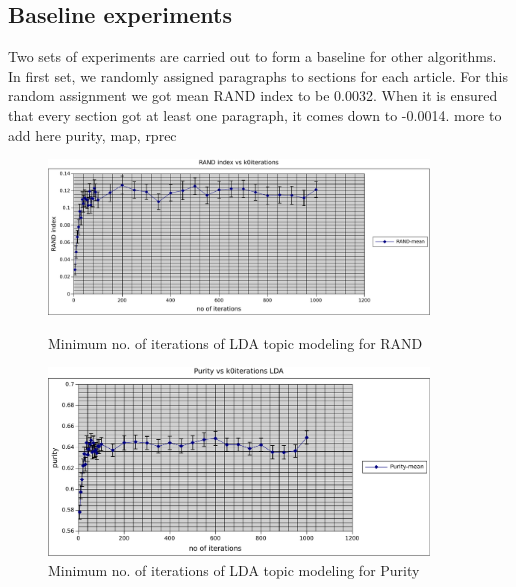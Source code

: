 \subsection{Baseline experiments} Two sets of experiments are carried out to form a baseline for other algorithms. In first set, we randomly assigned paragraphs to sections for each article. For this random assignment we got mean RAND index to be 0.0032. When it is ensured that every section got at least one paragraph, it comes down to -0.0014. more to add here purity, map, rprec
\begin{figure}
    \centering
    \begin{minipage}{0.45\textwidth}
        \centering
        \includegraphics[width=0.9\textwidth]{fig/rand_k0iter_lda.pdf}
        \caption{Minimum no. of iterations of LDA topic modeling for RAND}
    \end{minipage}\hfill
    \begin{minipage}{0.45\textwidth}
        \centering
        \includegraphics[width=0.9\textwidth]{fig/purity_k0iter_lda.pdf}
        \caption{Minimum no. of iterations of LDA topic modeling for Purity}
    \end{minipage}
\end{figure}
